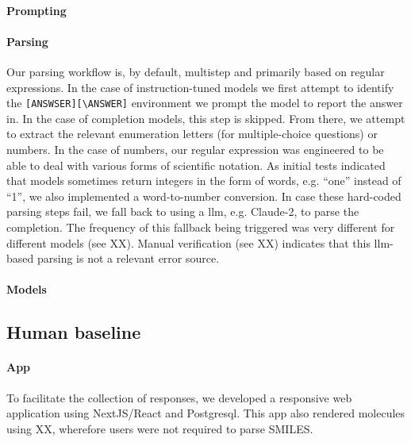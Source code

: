 \documentclass[11pt, oneside]{article}
\begin{document}
\paragraph{Prompting}

\paragraph{Parsing}
Our parsing workflow is, by default, multistep and primarily based on regular expressions. In the case of instruction-tuned models we first attempt to identify the \texttt{[ANSWSER][\textbackslash ANSWER]} environment we prompt the model to report the answer in. In the case of completion models, this step is skipped. From there, we attempt to extract the relevant enumeration letters (for multiple-choice questions) or numbers. In the case of numbers, our regular expression was engineered to be able to deal with various forms of scientific notation. As initial tests indicated that models sometimes return integers in the form of words, e.g. \enquote{one} instead of \enquote{1}, we also implemented a word-to-number conversion. In case these hard-coded parsing steps fail, we fall back to using a \gls{llm}, e.g. Claude-2, to parse the completion. The frequency of this fallback being triggered was very different for different models (see XX). Manual verification (see XX) indicates that this \gls{llm}-based parsing is not a relevant error source.

\paragraph{Models}


\subsection{Human baseline}

\paragraph{App} To facilitate the collection of responses, we developed a responsive web application using NextJS/React and Postgresql. This app also rendered molecules using XX, wherefore users were not required to parse SMILES.
\end{document}
